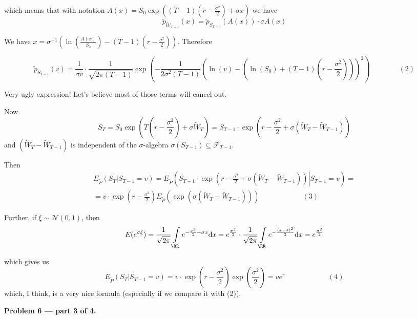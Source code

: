 \documentclass[12pt, a4paper]{article}
\renewcommand{\FF}{\mathcal{F}}
\newcommand{\ds}{\displaystyle}
\newcommand{\dx}{\mathrm{d}x}
\begin{document}
which means that with notation $A(x) = S_{0}\exp \left((T-1)\left(r - \frac{\ds \sigma^{2}}{\ds 2}\right) + \sigma x\right)$ we have
\[
\tilde{p}_{\tilde{W}_{T-1}}(x) = \tilde{p}_{S_{T-1}}\left(A(x)\right)\cdot \sigma A(x)
\]

We have $x = \sigma^{-1}\left(\ln\left(\frac{\ds A(x)}{\ds S_{0}}\right) - (T-1)\left(r - \frac{\ds \sigma^{2}}{\ds 2}\right)\right)$. Therefore

\[
 \tilde{p}_{S_{T-1}}\left(v\right) = \frac{\ds 1}{\ds \sigma v}\cdot \frac{\ds 1}{\ds \sqrt{2\pi (T-1)}}\exp\left(-\frac{\ds 1}{\ds 2\sigma^{2}(T-1)}\left(\ln(v) - \left(\ln(S_{0}) + (T-1)\left(r - \frac{\ds \sigma^{2}}{\ds 2}\right)\right)\right)^{2}\right) \qquad \qquad (2)
\]

Very ugly expression! Let's believe most of those terms will cancel out.

Now
\[
S_{T} = S_{0}\exp \left(T\left(r - \frac{\ds \sigma^{2}}{\ds 2}\right) + \sigma \tilde{W}_{T}\right) = S_{T-1}\cdot \exp\left(r - \frac{\ds \sigma^{2}}{\ds 2} + \sigma \left(\tilde{W}_{T} - \tilde{W}_{T-1}\right)\right)
\]
and $\left(\tilde{W}_{T} - \tilde{W}_{T-1}\right)$ is independent of the $\sigma$-algebra $\sigma(S_{T-1})\subseteq \FF_{T-1}$.


Then
\begin{multline}
 E_{\tilde{P}}\left(S_{T} | S_{T-1} = v\right) =  E_{\tilde{P}}\left(\left.S_{T-1}\cdot \exp\left(r - \frac{\ds \sigma^{2}}{\ds 2} + \sigma \left(\tilde{W}_{T} - \tilde{W}_{T-1}\right)\right) \right| S_{T-1} = v\right) =\\
 = v\cdot\exp\left(r - \frac{\ds \sigma^{2}}{\ds 2}\right) E_{\tilde{P}}\left(\exp\left(\sigma \left(\tilde{W}_{T} - \tilde{W}_{T-1}\right)\right)\right)\qquad\qquad\qquad (3)
\end{multline}


Further, if $\xi \sim \mathcal{N}(0,1)$, then
\[
E(e^{\sigma\xi}) = \frac{\ds 1}{\ds \sqrt{2\pi}}\int\limits_{\RR}e^{-\frac{x^{2}}{2} + \sigma x}\dx = e^{\frac{\sigma^{2}}{2}}\cdot\frac{\ds 1}{\ds \sqrt{2\pi}}\int\limits_{\RR}e^{-\frac{(x-\sigma)^{2}}{2}}\dx = e^{\frac{\sigma^{2}}{2}}
\]

which gives us
\[
E_{\tilde{P}}\left(S_{T} | S_{T-1} = v\right) = v\cdot\exp\left(r - \frac{\ds \sigma^{2}}{\ds 2}\right)\exp\left(\frac{\ds \sigma^{2}}{\ds 2}\right) = ve^{r}\qquad\qquad\qquad (4)
\]
which, I think, is a very nice formula (especially if we compare it with (2)).


\textbf{Problem 6 — part 3 of 4.}
\end{document}
